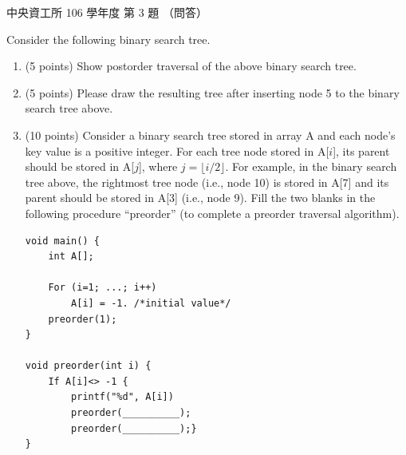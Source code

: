 \begin{pastexam}[label={px:ncu-106-dsa-03}]{中央資工所 106 學年度 第 3 題}
（問答）

Consider the following binary search tree.
\begin{center}
\end{center}
\begin{enumerate}[label=(\alph*)]
\item (5 points) Show postorder traversal of the above binary search tree.
\item (5 points) Please draw the resulting tree after inserting node 5 to the binary search tree above.
\item (10 points) Consider a binary search tree stored in array A and each node's key value is a
positive integer. For each tree node stored in A[$i$], its parent should be stored in A[$j$], where
$j=\lfloor i/2\rfloor$. For example, in the binary search tree above, the rightmost tree node
(i.e., node 10) is stored in A[7] and its parent should be stored in A[3] (i.e., node 9). Fill the
two blanks in the following procedure ``preorder'' (to complete a preorder traversal algorithm).
\begin{verbatim}
void main() {
    int A[];

    For (i=1; ...; i++)
        A[i] = -1. /*initial value*/
    preorder(1);
}

void preorder(int i) {
    If A[i]<> -1 {
        printf("%d", A[i])
        preorder(__________);
        preorder(__________);}
}
\end{verbatim}
\end{enumerate}
\end{pastexam}

